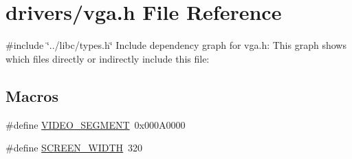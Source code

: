 \hypertarget{a00017}{}\section{drivers/vga.h File Reference}
\label{a00017}
{\ttfamily \#include \char`\"{}../libc/types.\+h\char`\"{}}\newline
Include dependency graph for vga.\+h\+:
This graph shows which files directly or indirectly include this file\+:
\subsection*{Macros}
\begin{DoxyCompactItemize}
\item 
\#define \hyperlink{a00017_a818608c80027ef8ff56d31ebaedf58f3_a818608c80027ef8ff56d31ebaedf58f3}{V\+I\+D\+E\+O\+\_\+\+S\+E\+G\+M\+E\+NT}~0x000\+A0000
\item 
\#define \hyperlink{a00017_a2cd109632a6dcccaa80b43561b1ab700_a2cd109632a6dcccaa80b43561b1ab700}{S\+C\+R\+E\+E\+N\+\_\+\+W\+I\+D\+TH}~320
\end{DoxyCompactItemize}
